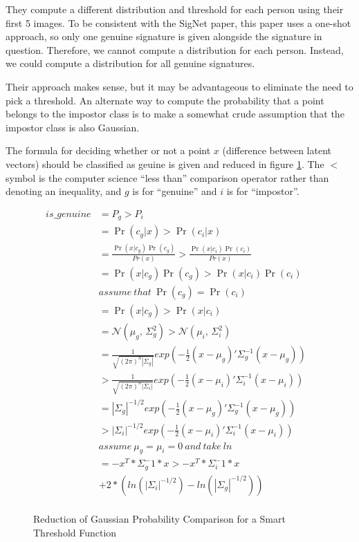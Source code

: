 They compute a different distribution and threshold for each person using their first 5 images.
To be consistent with the SigNet paper, this paper uses a one-shot approach, so only one genuine signature is given alongside the signature in question.
Therefore, we cannot compute a distribution for each person.
Instead, we could compute a distribution for all genuine signatures.

Their approach makes sense, but it may be advantageous to eliminate the need to pick a threshold.
An alternate way to compute the probability that a point belongs to the impostor class is to make a somewhat crude assumption that the impostor class is also Gaussian.

The formula for deciding whether or not a point $x$ (difference between latent vectors) should be classified as geuine is given and reduced in figure \ref{proof:gaussian}.
The $<$ symbol is the computer science ``less than'' comparison operator rather than denoting an inequality, and $g$ is for ``genuine'' and $i$ is for ``impostor''.

\begin{figure}
\begin{align*}
is\_genuine & = P_g > P_i&\\
        & = \Pr(c_g|x) > \Pr(c_i|x)&\\
        & = \frac{\Pr(x|c_g)\Pr(c_g)}{Pr(x)} > \frac{\Pr(x|c_i)\Pr(c_i)}{Pr(x)}&\\
        & = \Pr(x|c_g)\Pr(c_g) > \Pr(x|c_i)\Pr(c_i)&\\
        & assume\ that\ \Pr(c_g) = \Pr(c_i)&\\ %
        & = \Pr(x|c_g) > \Pr(x|c_i)&\\
        & = \mathcal{N}(\mu_g,\,\Sigma_g^{2}) > \mathcal{N}(\mu_i,\,\Sigma_i^{2})&\\
        & = \frac{1}{\sqrt{(2\pi)^{n}|\Sigma_g|}}exp(-\frac{1}{2}(x-\mu_g)'\Sigma_g^{-1}(x-\mu_g))&\\
        & > \frac{1}{\sqrt{(2\pi)^{n}|\Sigma_i|}}exp(-\frac{1}{2}(x-\mu_i)'\Sigma_i^{-1}(x-\mu_i))&\\
        & = |\Sigma_g|^{-1/2}exp(-\frac{1}{2}(x-\mu_g)'\Sigma_g^{-1}(x-\mu_g))&\\
        & > |\Sigma_i|^{-1/2}exp(-\frac{1}{2}(x-\mu_i)'\Sigma_i^{-1}(x-\mu_i))&\\
        & assume\ \mu_g = \mu_i = 0\ and\ take\ ln&\\
        & = -x^T * \Sigma_g^-1 * x > -x^T * \Sigma_i^-1 * x &\\
        &    + 2 * (ln(|\Sigma_i|^{-1/2}) - ln(|\Sigma_g|^{-1/2}))&\\
\end{align*}
\caption{Reduction of Gaussian Probability Comparison for a Smart Threshold Function}
\label{proof:gaussian}
\end{figure}

